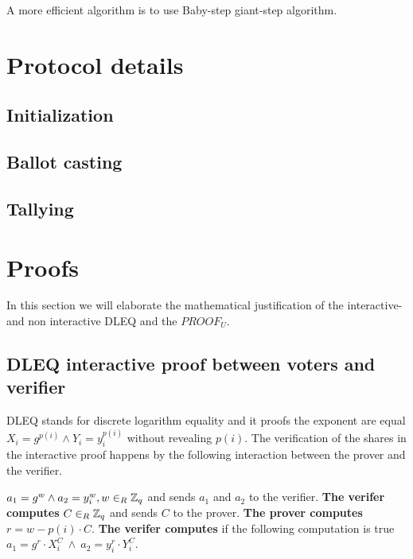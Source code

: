  A more efficient algorithm is to use Baby-step giant-step algorithm. 

\section{Protocol details}

\subsection{Initialization}
\subsection{Ballot casting}
\subsection{Tallying}

\section{Proofs}
In this section we will elaborate the mathematical justification of the interactive- and non interactive DLEQ and the $PROOF_U$. 

\subsection{DLEQ interactive proof between voters and verifier}
DLEQ stands for discrete logarithm equality and it proofs the exponent are equal \begin{math}X_i=g^{p(i)}  \land Y_i=y_i^{p(i)} \end{math} without revealing \begin{math}{p(i)} \end{math}. The verification of the shares in the interactive proof happens by the following  interaction between the prover and the verifier.

  \begin{math}a_1=g^w  \land a_2=y_i^w,  w\in_R \mathbb{Z}_q \end{math} and sends $a_1$ and $a_2$ to the verifier. \textbf{ The verifer computes}  \begin{math}C\in_R \mathbb{Z}_q \end{math} and sends $C$ to the prover. \textbf{The prover computes}  \begin{math}r=w-p(i)  \cdot  C\end{math}. \textbf{The verifer computes}  if the following computation is true \begin{math}a_1 = g^r \cdot X_i^C \ \land \ a_2=y_i^r \cdot Y_i^C\end{math}.


